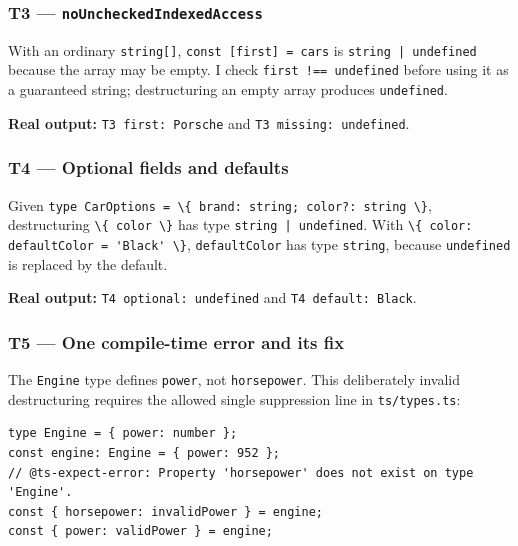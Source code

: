 \documentclass[
  9pt,
]{article}
\newcommand{\passthrough}[1]{#1}
\begin{document}
\subsubsection{\texorpdfstring{T3 ---
\texttt{noUncheckedIndexedAccess}}{T3 --- noUncheckedIndexedAccess}}\label{t3-nouncheckedindexedaccess}

With an ordinary \passthrough{\lstinline!string[]!},
\passthrough{\lstinline!const [first] = cars!} is
\passthrough{\lstinline!string | undefined!} because the array may be
empty. I check \passthrough{\lstinline"first !== undefined"} before
using it as a guaranteed string; destructuring an empty array produces
\passthrough{\lstinline!undefined!}.

\textbf{Real output:} \passthrough{\lstinline!T3 first: Porsche!} and
\passthrough{\lstinline!T3 missing: undefined!}.

\subsubsection{T4 --- Optional fields and
defaults}\label{t4-optional-fields-and-defaults}

Given
\passthrough{\lstinline!type CarOptions = \{ brand: string; color?: string \}!},
destructuring \passthrough{\lstinline!\{ color \}!} has type
\passthrough{\lstinline!string | undefined!}. With
\passthrough{\lstinline!\{ color: defaultColor = 'Black' \}!},
\passthrough{\lstinline!defaultColor!} has type
\passthrough{\lstinline!string!}, because
\passthrough{\lstinline!undefined!} is replaced by the default.

\textbf{Real output:} \passthrough{\lstinline!T4 optional: undefined!}
and \passthrough{\lstinline!T4 default: Black!}.

\subsubsection{T5 --- One compile-time error and its
fix}\label{t5-one-compile-time-error-and-its-fix}

The \passthrough{\lstinline!Engine!} type defines
\passthrough{\lstinline!power!}, not
\passthrough{\lstinline!horsepower!}. This deliberately invalid
destructuring requires the allowed single suppression line in
\passthrough{\lstinline!ts/types.ts!}:

\begin{lstlisting}
type Engine = { power: number };
const engine: Engine = { power: 952 };
// @ts-expect-error: Property 'horsepower' does not exist on type 'Engine'.
const { horsepower: invalidPower } = engine;
const { power: validPower } = engine;
\end{lstlisting}
\end{document}
